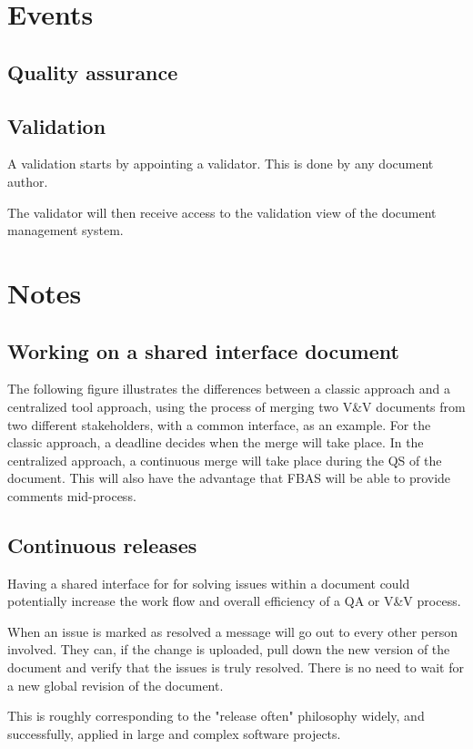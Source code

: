 \documentclass[10pt,a4paper]{article}
\begin{document}
\section{Events}
\subsection{Quality assurance}

\subsection{Validation}
A validation starts by appointing a validator. This is done by any document author.

The validator will then receive access to the validation view of the document management system.


\section{Notes}


\subsection{Working on a shared interface document}
The following figure illustrates the differences between a classic approach and a centralized tool approach, using the process of merging two V\&V documents from two different stakeholders, with a common interface, as an example.
For the classic approach, a deadline decides when the merge will take place. In the centralized approach, a continuous merge will take place during the QS of the document. This will also have the advantage that FBAS will be able to provide comments mid-process.

\subsection{Continuous releases}
Having a shared interface for for solving issues within a document could potentially increase the work flow and overall efficiency of a QA or V\&V process. 

When an issue is marked as resolved a message will go out to every other person involved. They can, if the change is uploaded, pull down the new version of the document and verify that the issues is truly resolved. There is no need to wait for a new global revision of the document.

This is roughly corresponding to the "release often" philosophy widely, and successfully, applied in large and complex software projects.
\end{document}
